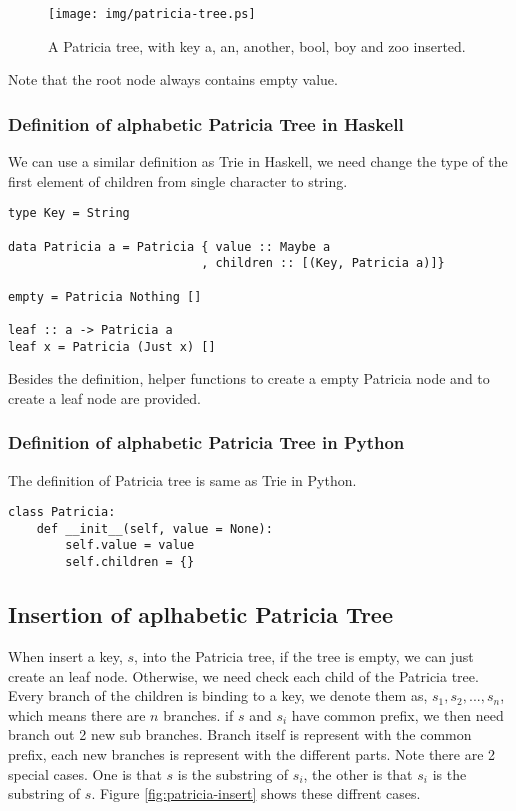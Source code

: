\documentclass{article}
\begin{document}
\begin{figure}[htbp]
  \begin{center}
    \texttt{[image: img/patricia-tree.ps]}
      \caption{A Patricia tree, with key a, an, another, bool,
    boy and zoo inserted.}
      \label{fig:patricia-tree}
  \end{center}
\end{figure}

Note that the root node always contains empty value.

\subsubsection*{Definition of alphabetic Patricia Tree in Haskell}
We can use a similar definition as Trie in Haskell, we need change
the type of the first element of children from single character to
string.

\lstset{language=Haskell}
\begin{lstlisting}
type Key = String

data Patricia a = Patricia { value :: Maybe a
                           , children :: [(Key, Patricia a)]}

empty = Patricia Nothing []

leaf :: a -> Patricia a
leaf x = Patricia (Just x) []
\end{lstlisting}

Besides the definition, helper functions to create a empty
Patricia node and to create a leaf node are provided.

\subsubsection*{Definition of alphabetic Patricia Tree in Python}
The definition of Patricia tree is same as Trie in Python.

\lstset{language=Python}
\begin{lstlisting}
class Patricia:
    def __init__(self, value = None):
        self.value = value
        self.children = {}
\end{lstlisting}

\subsection{Insertion of aplhabetic Patricia Tree}
When insert a key, $s$, into the Patricia tree, if the tree is empty, we
can just create an leaf node. Otherwise, we need check each child of the
Patricia tree. Every branch of the children is binding to a key, we denote
them as, $s_1, s_2, ..., s_n$, which means there are $n$ branches.
if $s$ and $s_i$ have common prefix, we then need branch out 2 new sub
branches. Branch itself is represent with the common prefix, each new
branches is represent with the different parts. Note there are 2 special
cases. One is that $s$ is the substring of $s_i$, the other is that $s_i$
is the substring of $s$. Figure \ref{fig:patricia-insert} shows these
diffrent cases.
\end{document}

